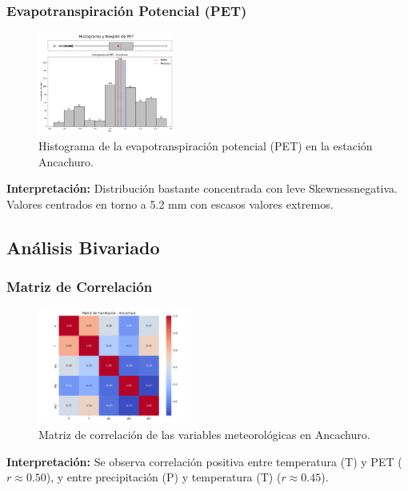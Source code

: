 \subsubsection*{Evapotranspiración Potencial (PET)}
\begin{figure}[H]
\centering
\includegraphics[width=0.4\textwidth]{resultados/por_estacion_meteorologica/Ancachuro/PET_histograma.png}
\caption{Histograma de la evapotranspiración potencial (PET) en la estación Ancachuro.}
\label{fig:ancachuro_PET}
\end{figure}
\textbf{Interpretación:} Distribución bastante concentrada con leve Skewnessnegativa. Valores centrados en torno a 5.2 mm con escasos valores extremos.

\subsection{Análisis Bivariado}

\subsubsection*{Matriz de Correlación}
\begin{figure}[H]
\centering
\includegraphics[width=0.45\textwidth]{resultados/por_estacion_meteorologica/Ancachuro/matriz_correlacion.png}
\caption{Matriz de correlación de las variables meteorológicas en Ancachuro.}
\label{fig:ancachuro_corr}
\end{figure}
\textbf{Interpretación:} Se observa correlación positiva entre temperatura (T) y PET ($r \approx 0.50$), y entre precipitación (P) y temperatura (T) ($r \approx 0.45$).

